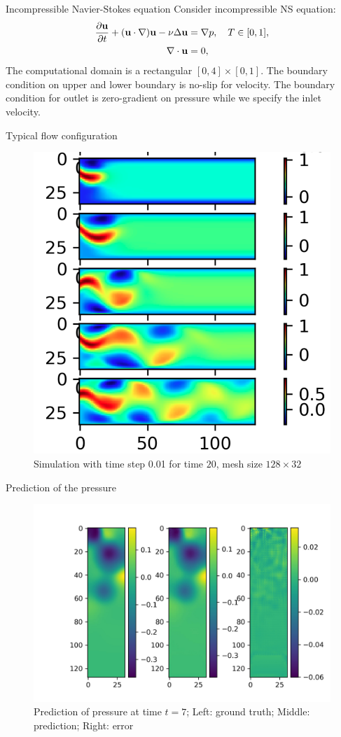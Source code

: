 \documentclass{beamer}
\begin{document}
\begin{frame}{Incompressible Navier-Stokes equation}
	Consider incompressible NS equation:
	\begin{equation}\label{FN}
    \begin{aligned}
        	\frac{\partial \mathbf{u}}{\partial t} + (\mathbf{u} \cdot \nabla)\mathbf{u} -  \nu \Delta \mathbf{u} & =   \nabla p, \quad T \in [0, 1], 	\\
		\nabla \cdot \mathbf{u} & = 0,
    \end{aligned}
\end{equation}
	The computational domain is a rectangular $[0, 4]\times [0, 1]$. The boundary condition on upper and lower boundary is no-slip for velocity. The boundary condition for outlet is zero-gradient on pressure while we specify the inlet velocity.
\end{frame}


\begin{frame}{Typical flow configuration}
	\begin{figure}[H]
          \centering
          \centerline{\includegraphics[width=0.6\linewidth]{fig/ns.png}}
          \caption{Simulation with time step 0.01 for time $20$, mesh size $128 \times 32$}
\end{figure}
\end{frame}


\begin{frame}{Prediction of the pressure}
	\begin{figure}[H]
          \centering
          \centerline{\includegraphics[width=0.9\linewidth]{fig/ns_p.jpg}}
          \caption{Prediction of pressure at time $t=7$; Left: ground truth; Middle: prediction; Right: error}
\end{figure}
\end{frame}
\end{document}
